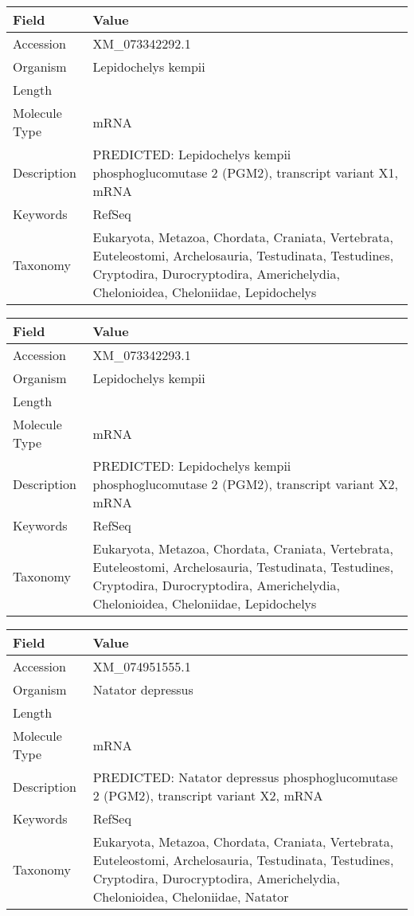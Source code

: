 \documentclass[10pt]{article}
\begin{document}
{\footnotesize
\begin{longtable}{>{\raggedright\arraybackslash}p{4.5cm} >{\raggedright\arraybackslash}p{11.5cm}}
\textbf{Field} & \textbf{Value} \\
\hline
Accession & XM\_073342292.1 \\
Organism & Lepidochelys kempii \\
Length & 3775 \\
Molecule Type & mRNA \\
Description & PREDICTED: Lepidochelys kempii phosphoglucomutase 2 (PGM2), transcript variant X1, mRNA \\
Keywords & RefSeq \\
Taxonomy & Eukaryota, Metazoa, Chordata, Craniata, Vertebrata, Euteleostomi, Archelosauria, Testudinata, Testudines, Cryptodira, Durocryptodira, Americhelydia, Chelonioidea, Cheloniidae, Lepidochelys \\
\end{longtable}
}

{\footnotesize
\begin{longtable}{>{\raggedright\arraybackslash}p{4.5cm} >{\raggedright\arraybackslash}p{11.5cm}}
\textbf{Field} & \textbf{Value} \\
\hline
Accession & XM\_073342293.1 \\
Organism & Lepidochelys kempii \\
Length & 1872 \\
Molecule Type & mRNA \\
Description & PREDICTED: Lepidochelys kempii phosphoglucomutase 2 (PGM2), transcript variant X2, mRNA \\
Keywords & RefSeq \\
Taxonomy & Eukaryota, Metazoa, Chordata, Craniata, Vertebrata, Euteleostomi, Archelosauria, Testudinata, Testudines, Cryptodira, Durocryptodira, Americhelydia, Chelonioidea, Cheloniidae, Lepidochelys \\
\end{longtable}
}

{\footnotesize
\begin{longtable}{>{\raggedright\arraybackslash}p{4.5cm} >{\raggedright\arraybackslash}p{11.5cm}}
\textbf{Field} & \textbf{Value} \\
\hline
Accession & XM\_074951555.1 \\
Organism & Natator depressus \\
Length & 4223 \\
Molecule Type & mRNA \\
Description & PREDICTED: Natator depressus phosphoglucomutase 2 (PGM2), transcript variant X2, mRNA \\
Keywords & RefSeq \\
Taxonomy & Eukaryota, Metazoa, Chordata, Craniata, Vertebrata, Euteleostomi, Archelosauria, Testudinata, Testudines, Cryptodira, Durocryptodira, Americhelydia, Chelonioidea, Cheloniidae, Natator \\
\end{longtable}
}
\end{document}
